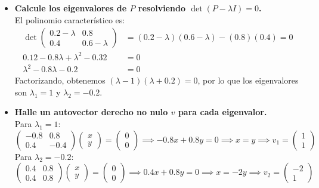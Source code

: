 \documentclass[10pt,a4paper]{book}
\begin{document}
\begin{itemize}
    \item[\textbf{a)}] \textbf{Calcule los eigenvalores de $P$ resolviendo $\det(P - \lambda I) = 0$.} \\
    El polinomio característico es:
    \begin{align*}
        \det \begin{pmatrix} 0.2 - \lambda & 0.8 \\ 0.4 & 0.6 - \lambda \end{pmatrix} &= (0.2 - \lambda)(0.6 - \lambda) - (0.8)(0.4) = 0 \\
        0.12 - 0.8\lambda + \lambda^2 - 0.32 &= 0 \\
        \lambda^2 - 0.8\lambda - 0.2 &= 0
    \end{align*}
    Factorizando, obtenemos $(\lambda - 1)(\lambda + 0.2) = 0$, por lo que los eigenvalores son $\lambda_1 = 1$ y $\lambda_2 = -0.2$.

    \item[\textbf{b)}] \textbf{Halle un autovector derecho no nulo $v$ para cada eigenvalor.} \\
    Para $\lambda_1 = 1$:
    \[ \begin{pmatrix} -0.8 & 0.8 \\ 0.4 & -0.4 \end{pmatrix} \begin{pmatrix} x \\ y \end{pmatrix} = \begin{pmatrix} 0 \\ 0 \end{pmatrix} \implies -0.8x + 0.8y = 0 \implies x = y \implies v_1 = \begin{pmatrix} 1 \\ 1 \end{pmatrix} \]
    Para $\lambda_2 = -0.2$:
    \[ \begin{pmatrix} 0.4 & 0.8 \\ 0.4 & 0.8 \end{pmatrix} \begin{pmatrix} x \\ y \end{pmatrix} = \begin{pmatrix} 0 \\ 0 \end{pmatrix} \implies 0.4x + 0.8y = 0 \implies x = -2y \implies v_2 = \begin{pmatrix} -2 \\ 1 \end{pmatrix} \]


\end{itemize}
\end{document}
